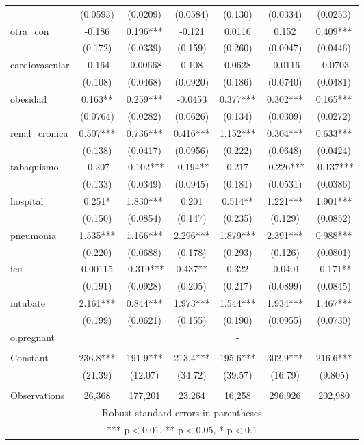 \documentclass[]{article}
\begin{document}
\begin{tabular}{lcccccc}
 & (0.0593) & (0.0209) & (0.0584) & (0.130) & (0.0334) & (0.0253) \\
otra\_con & -0.186 & 0.196*** & -0.121 & 0.0116 & 0.152 & 0.409*** \\
 & (0.172) & (0.0339) & (0.159) & (0.260) & (0.0947) & (0.0446) \\
cardiovascular & -0.164 & -0.00668 & 0.108 & 0.0628 & -0.0116 & -0.0703 \\
 & (0.108) & (0.0468) & (0.0920) & (0.186) & (0.0740) & (0.0481) \\
obesidad & 0.163** & 0.259*** & -0.0453 & 0.377*** & 0.302*** & 0.165*** \\
 & (0.0764) & (0.0282) & (0.0626) & (0.134) & (0.0309) & (0.0272) \\
renal\_cronica & 0.507*** & 0.736*** & 0.416*** & 1.152*** & 0.304*** & 0.633*** \\
 & (0.138) & (0.0417) & (0.0956) & (0.222) & (0.0648) & (0.0424) \\
tabaquismo & -0.207 & -0.102*** & -0.194** & 0.217 & -0.226*** & -0.137*** \\
 & (0.133) & (0.0349) & (0.0945) & (0.181) & (0.0531) & (0.0386) \\
hospital & 0.251* & 1.830*** & 0.201 & 0.514** & 1.221*** & 1.901*** \\
 & (0.150) & (0.0854) & (0.147) & (0.235) & (0.129) & (0.0852) \\
pneumonia & 1.535*** & 1.166*** & 2.296*** & 1.879*** & 2.391*** & 0.988*** \\
 & (0.220) & (0.0688) & (0.178) & (0.293) & (0.126) & (0.0801) \\
icu & 0.00115 & -0.319*** & 0.437** & 0.322 & -0.0401 & -0.171** \\
 & (0.191) & (0.0928) & (0.205) & (0.217) & (0.0899) & (0.0845) \\
intubate & 2.161*** & 0.844*** & 1.973*** & 1.544*** & 1.934*** & 1.467*** \\
 & (0.199) & (0.0621) & (0.155) & (0.190) & (0.0955) & (0.0730) \\
o.pregnant &  &  &  & - &  &  \\
 &  &  &  &  &  &  \\
Constant & 236.8*** & 191.9*** & 213.4*** & 195.6*** & 302.9*** & 216.6*** \\
 & (21.39) & (12.07) & (34.72) & (39.57) & (16.79) & (9.805) \\
 &  &  &  &  &  &  \\
 Observations & 26,368 & 177,201 & 23,264 & 16,258 & 296,926 & 202,980 \\ \hline
\multicolumn{7}{c}{ Robust standard errors in parentheses} \\
\multicolumn{7}{c}{ *** p$<$0.01, ** p$<$0.05, * p$<$0.1} \\
\end{tabular}
\end{document}

